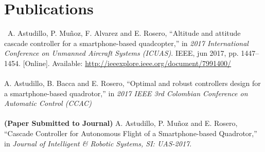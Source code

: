 \chapter*{Publications} \label{publications}
\
A. Astudillo, P. Muñoz, F. Alvarez and E. Rosero, “Altitude and attitude cascade controller for a smartphone-based quadcopter,” in \textit{2017 International Conference on Unmanned Aircraft Systems (ICUAS)}. IEEE, jun 2017, pp. 1447–1454. [Online]. Available: \url{http://ieeexplore.ieee.org/document/7991400/}
\\\\
A. Astudillo, B. Bacca and E. Rosero, “Optimal and robust controllers design for a smartphone-based quadrotor,” in \textit{2017 IEEE 3rd Colombian Conference on Automatic Control (CCAC)}
\\\\
\textbf{(Paper Submitted to Journal)} A. Astudillo, P. Muñoz and E. Rosero, “Cascade Controller for Autonomous Flight of a Smartphone-based Quadrotor,” in \textit{Journal of Intelligent \& Robotic Systems, SI: UAS-2017}.

